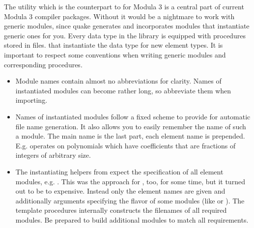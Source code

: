 The  utility which is the counterpart
to  for Modula 3
is a central part of current Modula 3 compiler packages.
Without  it would be a nightmare
to work with generic modules,
since quake generates and incorporates
modules that instantiate generic ones for you.
Every data type in the \modna{} library
is equipped with  procedures
stored in  files.
that instantiate the data type for new element types.
It is important to respect some conventions
when writing generic modules and
corresponding  procedures.
\begin{itemize}
\item Module names contain almost no abbreviations for clarity.
Names of instantiated modules can become rather long, so abbreviate them when importing.
\item Names of instantiated modules follow a fixed scheme
to provide for automatic file name generation.
It also allows you to easily remember the name of such a module.
The main name is the last part, each element name is prepended.
E.g. 
operates on polynomials which have coefficients
that are fractions of integers of arbitrary size.
\item The instantiating helpers from 
expect the specification of all element modules,
e.g. .
This was the approach for \modna{}, too, for some time,
but it turned out to be to expensive.
Instead only the element names are given
and additionally arguments specifying the flavor
of some modules (like  or ).
The  template procedures
internally constructs the filenames of all required modules.
Be prepared to build additional modules
to match all requirements.


\end{itemize}
